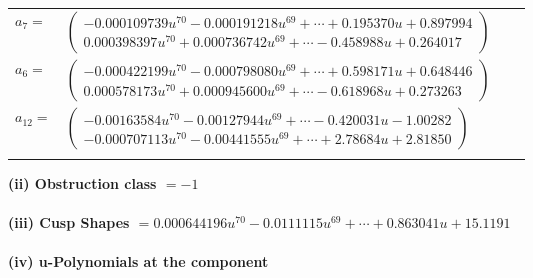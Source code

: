 \documentclass[1p]{elsarticle_modified}
\theoremstyle{definition}
\begin{document}
\begin{tabular}{m{7pt} m{180pt} m{7pt} m{180pt} }
\flushright $a_{7}=$&$\begin{pmatrix}-0.000109739 u^{70}-0.000191218 u^{69}+\cdots+0.195370 u+0.897994\\0.000398397 u^{70}+0.000736742 u^{69}+\cdots-0.458988 u+0.264017\end{pmatrix}$ \\
\flushright $a_{6}=$&$\begin{pmatrix}-0.000422199 u^{70}-0.000798080 u^{69}+\cdots+0.598171 u+0.648446\\0.000578173 u^{70}+0.000945600 u^{69}+\cdots-0.618968 u+0.273263\end{pmatrix}$ \\
\flushright $a_{12}=$&$\begin{pmatrix}-0.00163584 u^{70}-0.00127944 u^{69}+\cdots-0.420031 u-1.00282\\-0.000707113 u^{70}-0.00441555 u^{69}+\cdots+2.78684 u+2.81850\end{pmatrix}$\\&\end{tabular}
\flushleft \textbf{(ii) Obstruction class $= -1$}\\~\\
\flushleft \textbf{(iii) Cusp Shapes $= 0.000644196 u^{70}-0.0111115 u^{69}+\cdots+0.863041 u+15.1191$}\\~\\
\newpage\renewcommand{\arraystretch}{1}
\flushleft \textbf{(iv) u-Polynomials at the component}\newline \\
\end{document}
